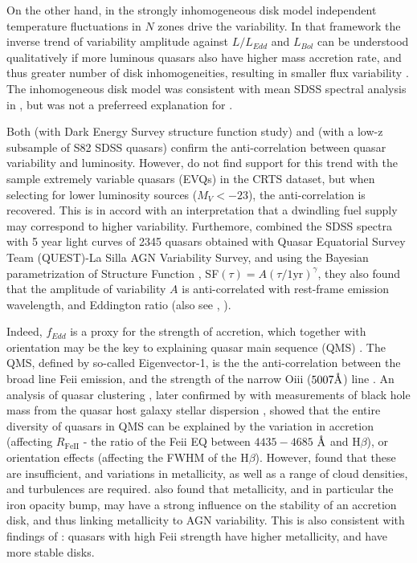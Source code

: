 \documentclass[twocolumn]{aastex62}
\let\oldAA\AA
\renewcommand{\AA}{\text{\normalfont\oldAA}}
\begin{document}
On the other hand, in the strongly inhomogeneous disk model \citet{dexter2011} independent temperature fluctuations in $N$ zones drive the variability. In that framework the inverse trend of variability amplitude against $L/L_{Edd}$  and $L_{Bol}$  can be understood qualitatively if more luminous quasars also have higher mass accretion rate, and thus greater number of disk inhomogeneities, resulting in smaller flux variability \citep{simm2016}. The inhomogeneous disk model was consistent with mean SDSS spectral analysis in \citet{ruan2014}, but was not a preferreed explanation for \citet{kokubo2015}. 

Both \citealt{rumbaugh2018} (with Dark Energy Survey structure function study) and  \citet{sun2018}  (with a low-z subsample of S82 SDSS quasars) confirm the anti-correlation between quasar variability and luminosity. However, \citealt{graham2019} do not find support for this trend with the sample extremely variable quasars (EVQs) in the CRTS dataset,  but when selecting for lower luminosity sources ($M_{V} < -23$), the anti-correlation is recovered. This is in accord with an interpretation that a dwindling fuel supply may correspond to higher variability. Furthemore, \citet{sanchez2018} combined the SDSS spectra with 5 year light curves of 2345 quasars obtained with Quasar Equatorial Survey Team (QUEST)-La Silla AGN Variability Survey, and  using the Bayesian parametrization of Structure Function \citep{schmidt2010},  SF$(\tau) = A(\tau/1 \mathrm{yr})^{\gamma} $, they also found that the amplitude of variability $A$ is anti-correlated with rest-frame emission wavelength,  and Eddington ratio (also see \citealt{simm2016}, \citealt{rakshit2017}).

Indeed, $f_{Edd}$ is a proxy for the strength of accretion, which together with orientation may be the key to explaining quasar main sequence (QMS) \citep{shen2014, marziani2018}. The QMS, defined by so-called Eigenvector-1, is the the anti-correlation between the broad line Fe{\sc ii} emission, and the strength of the narrow O{\sc iii} ($5007 \mbox{\AA}$) line \citep{wang1996}. An analysis of quasar clustering \citep{shen2014}, later confirmed by \citet{sun2015} with measurements of  black hole mass from the quasar host galaxy stellar dispersion \citep{ferrarese2000, kormendy2013}, showed that the entire diversity of quasars in  QMS can be explained by the variation in accretion (affecting $R_{\mathrm{Fe  II}}$ - the ratio of the  Fe{\sc ii} EQ  between $4435-4685$ $\mbox{\AA}$ and H$\beta$), or orientation effects (affecting the FWHM of the H$\beta$). However, \citet{panda2019a, panda2019b} found that these are insufficient, and variations in metallicity, as well as a range of cloud densities, and turbulences are required.  \cite{jiang2016} also found that metallicity, and in particular the iron opacity bump, may have a strong influence on the stability of an accretion disk, and thus linking metallicity to AGN variability. This is also consistent with findings of \cite{sun2018}: quasars with high  Fe{\sc ii} strength have higher metallicity, and have more stable disks. 
\end{document}
